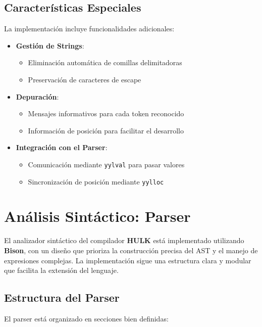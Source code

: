 \documentclass[11pt, a4paper, twoside]{article} %
\begin{document}
\subsection{Características Especiales}

La implementación incluye funcionalidades adicionales:

\begin{itemize}
    \item \textbf{Gestión de Strings}:
    \begin{itemize}
        \item Eliminación automática de comillas delimitadoras
        \item Preservación de caracteres de escape
    \end{itemize}

    \item \textbf{Depuración}:
    \begin{itemize}
        \item Mensajes informativos para cada token reconocido
        \item Información de posición para facilitar el desarrollo
    \end{itemize}

    \item \textbf{Integración con el Parser}:
    \begin{itemize}
        \item Comunicación mediante \texttt{yylval} para pasar valores
        \item Sincronización de posición mediante \texttt{yylloc}
    \end{itemize}
\end{itemize}

\section{An\'alisis Sint\'actico: Parser}

El analizador sintáctico del compilador \textbf{HULK} está implementado utilizando \textbf{Bison}, con un diseño que prioriza la construcción precisa del AST y el manejo de expresiones complejas. La implementación sigue una estructura clara y modular que facilita la extensión del lenguaje.

\subsection{Estructura del Parser}

El parser está organizado en secciones bien definidas:
\end{document}
